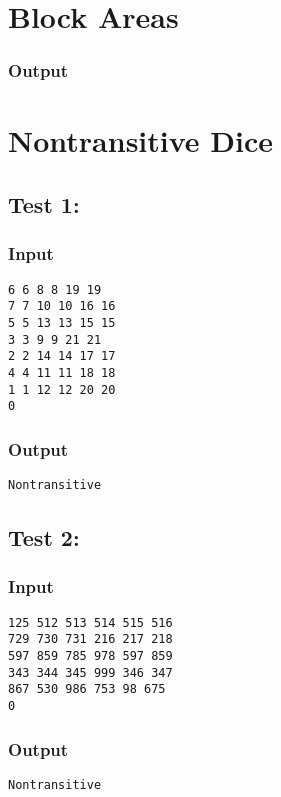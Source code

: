 \documentclass[twocolumn]{extarticle}
\begin{document}
\section{Block Areas}
\subsubsection*{Output}
\texttt{}


\newpage
\section{Nontransitive Dice}
\subsection*{Test 1:}
\subsubsection*{Input}
\texttt{6 6 8 8 19 19\\
7 7 10 10 16 16\\
5 5 13 13 15 15\\
3 3 9 9 21 21\\
2 2 14 14 17 17\\
4 4 11 11 18 18\\
1 1 12 12 20 20\\
0}
 
\subsubsection*{Output}
\texttt{Nontransitive}
 
\subsection*{Test 2:}
\subsubsection*{Input}
\texttt{125 512 513 514 515 516\\
729 730 731 216 217 218\\
597 859 785 978 597 859\\
343 344 345 999 346 347\\
867 530 986 753 98 675\\
0}
 
\subsubsection*{Output}
\texttt{Nontransitive}
 
\end{document}
